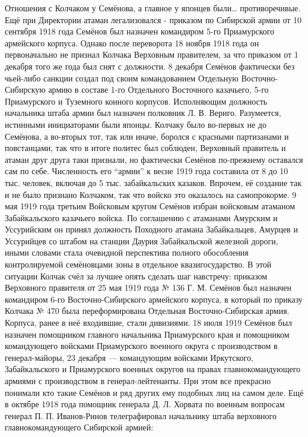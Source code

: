 Отношения с Колчаком у Семёнова, а главное у японцев были… противоречивые. Ещё при Директории атаман легализовался - приказом по Сибирской армии от 10 сентября 1918 года Семёнов был назначен командиром 5-го Приамурского армейского корпуса. Однако после переворота 18 ноября 1918 года он первоначально не признал Колчака Верховным правителем, за что приказом от 1 декабря того же года был снят с должности. 8 декабря Семёнов фактически без чьей-либо санкции создал под своим командованием Отдельную Восточно-Сибирскую армию в составе 1-го Отдельного Восточного казачьего, 5-го Приамурского и Туземного конного корпусов. Исполняющим должность начальника штаба армии был назначен полковник Л. В. Вериго. Разумеется, истинными инициаторами были японцы. Колчаку было во-первых не до Семёнова, а во-вторых тот, так или иначе, боролся с красными партизанами и повстанцами, так что в итоге политес был соблюден, Верховный правитель и атаман друг друга таки признали, но фактически Семёнов по-прежнему оставался сам по себе. Численность его “армии” к весне 1919 года составила от 8 до 10 тыс. человек, включая до 5 тыс. забайкальских казаков. Впрочем, её создание так и не было признано Колчаком, так что войско это оказалось на самопрокорме. 9 мая 1919 года третьим Войсковым кругом Семёнов избран войсковым атаманом Забайкальского казачьего войска. По соглашению с атаманами Амурским и Уссурийским он принял должность Походного атамана Забайкальцев, Амурцев и Уссурийцев со штабом на станции Даурия Забайкальской железной дороги, иными словами стала очевидной перспектива полного обособления контролируемой семёновцами зоны в отдельное квазигосударство. В этой ситуации Колчак счёл за лучшее опять сделать шаг навстречу: приказом Верховного правителя от 25 мая 1919 года № 136 Г. М. Семёнов был назначен командиром 6-го Восточно-Сибирского армейского корпуса, в который по приказу Колчака № 470 была переформирована Отдельная Восточно-Сибирская армия. Корпуса, ранее в неё входившие, стали дивизиями. 18 июля 1919 Семёнов был назначен помощником главного начальника Приамурского края и помощником командующего войсками Приамурского военного округа с производством в генерал-майоры, 23 декабря — командующим войсками Иркутского, Забайкальского и Приамурского военных округов на правах главнокомандующего армиями с производством в генерал-лейтенанты. При этом все прекрасно понимали кто такие Семёнов и ряд других ему подобных лиц на самом деле. Ещё в октябре 1918 года помощник генерала Д. Л. Хорвата по военным вопросам генерал П. П. Иванов-Ринов телеграфировал начальнику штаба верховного главнокомандующего Сибирской армией:

